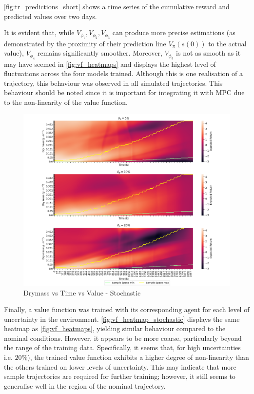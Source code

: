 	


\autoref{fig:tr_predictions_short} shows a time series of the cumulative reward and predicted values over two days.
 

\begin{remark}\label{rem:vf-smoothness}
	It is evident that, while $V_{\phi_1}, V_{\phi_2}, V_{\phi_3}$ can produce more precise estimations (as demonstrated by the proximity of their prediction line $V_{\pi}(s(0))$ to the actual value), $V_{\phi_4}$ remains significantly smoother. Moreover, $V_{\phi_3}$  is not as smooth as it may have seemed in \autoref{fig:vf_heatmaps} and displays the highest level of fluctuations across the four models trained. Although this is one realisation of a trajectory, this behaviour was observed in all simulated trajectories. This behaviour should be noted since it is important for integrating it with MPC due to the non-linearity of the value function.
\end{remark}



\begin{figure}[H]
	\centering
	\includegraphics[width = \textwidth]{figures/vf_heatmap_stochastic_test.png}
	\caption{Drymass vs Time vs Value - Stochastic}
	\label{fig:vf_heatmap_stochastic}
\end{figure}


Finally, a value function was trained with its corresponding agent for each level of uncertainty in the environment. \autoref{fig:vf_heatmap_stochastic} displays the same heatmap as \autoref{fig:vf_heatmaps}, yielding similar behaviour compared to the nominal conditions. However, it appears to be more coarse, particularly beyond the range of the training data. Specifically, it seems that, for high uncertainties i.e. $20\%$), the trained value function exhibits a higher degree of non-linearity than the others trained on lower levels of uncertainty. This may indicate that more sample trajectories are required for further training; however, it still seems to generalise well in the region of the nominal trajectory.

